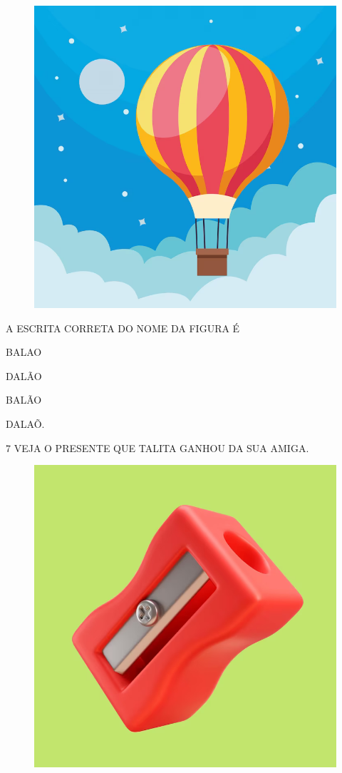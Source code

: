 \begin{figure}[H]
\centering
\includegraphics[width=.7\textwidth]{./media/image232.png}
\end{figure}

A ESCRITA CORRETA DO NOME DA FIGURA É

\begin{escolha}

\item BALAO

\item DALÃO

\item BALÃO

\item DALAÕ.

\end{escolha}

\num{7} VEJA O PRESENTE QUE TALITA GANHOU DA SUA AMIGA.

\begin{figure}[H]
\centering
\includegraphics[width=.6\textwidth]{./media/image233.png}
\end{figure}

